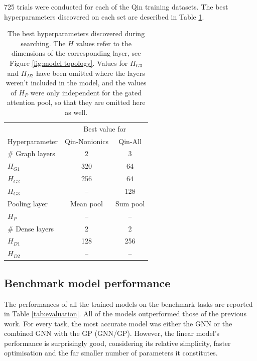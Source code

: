 \num{725} trials were conducted for each of the Qin training datasets. The best
hyperparameters discovered on each set are described in Table \ref{tab:hb-hps}.

\begin{table}
    \centering
    \caption{The best hyperparameters discovered during searching. The $H$
        values refer to the dimensions of the corresponding layer, see Figure
        \ref{fig:model-topology}. Values for $H_{G3}$ and $H_{D2}$ have been
        omitted where the layers weren't included in the model, and the values
        of $H_P$ were only independent for the gated attention pool, so that
        they are omitted here as well.}
    \label{tab:hb-hps}
    \begin{tabular}{@{}lcc@{}} \toprule
                        & \multicolumn{2}{c}{Best value for}            \\\cmidrule(l){2-3}
        Hyperparameter  & Qin-Nonionics                      & Qin-All  \\\midrule
        \# Graph layers & 2                                  & 3        \\
        $H_{G1}$        & 320                                & 64       \\
        $H_{G2}$        & 256                                & 64       \\
        $H_{G3}$        & --                                 & 128      \\
        Pooling layer   & Mean pool                          & Sum pool \\
        $H_P$           & --                                 & --       \\
        \# Dense layers & 2                                  & 2        \\
        $H_{D1}$        & 128                                & 256      \\
        $H_{D2}$        & --                                 & --       \\\bottomrule
    \end{tabular}
\end{table}

\subsection{Benchmark model performance}

The performances of all the trained models on the benchmark tasks are reported in Table \ref{tab:evaluation}. All of the models outperformed those of the previous work. For every task, the most accurate model was either the GNN or the combined GNN with the GP (GNN/GP). However, the linear model's performance is surprisingly good, considering its relative simplicity, faster optimisation and the far smaller number of parameters it constitutes.

